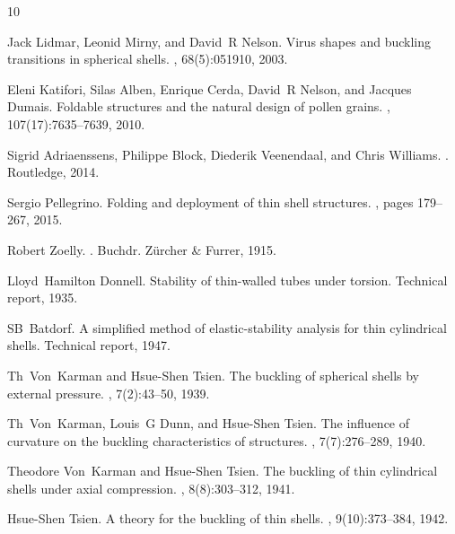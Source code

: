 \documentclass[twocolumn,letter,11pt]{article}
\begin{document}
\begin{thebibliography}{10}

Jack Lidmar, Leonid Mirny, and David~R Nelson.
\newblock Virus shapes and buckling transitions in spherical shells.
, 68(5):051910, 2003.

Eleni Katifori, Silas Alben, Enrique Cerda, David~R Nelson, and Jacques Dumais.
\newblock Foldable structures and the natural design of pollen grains.
,
  107(17):7635--7639, 2010.

Sigrid Adriaenssens, Philippe Block, Diederik Veenendaal, and Chris Williams.
.
\newblock Routledge, 2014.

Sergio Pellegrino.
\newblock Folding and deployment of thin shell structures.
, pages 179--267, 2015.

Robert Zoelly.
.
\newblock Buchdr. Z{\"u}rcher \& Furrer, 1915.

Lloyd~Hamilton Donnell.
\newblock Stability of thin-walled tubes under torsion.
\newblock Technical report, 1935.

SB~Batdorf.
\newblock A simplified method of elastic-stability analysis for thin
  cylindrical shells.
\newblock Technical report, 1947.

Th~Von~Karman and Hsue-Shen Tsien.
\newblock The buckling of spherical shells by external pressure.
, 7(2):43--50, 1939.

Th~Von~Karman, Louis~G Dunn, and Hsue-Shen Tsien.
\newblock The influence of curvature on the buckling characteristics of
  structures.
, 7(7):276--289, 1940.

Theodore Von~Karman and Hsue-Shen Tsien.
\newblock The buckling of thin cylindrical shells under axial compression.
, 8(8):303--312, 1941.

Hsue-Shen Tsien.
\newblock A theory for the buckling of thin shells.
, 9(10):373--384, 1942.


\end{thebibliography}
\end{document}
